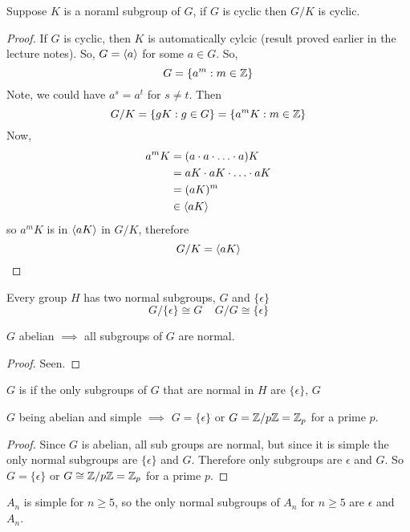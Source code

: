 \documentclass[openany]{report}
\begin{document}
\begin{prop}
    Suppose $K$ is a noraml subgroup of $G$, if $G$ is cyclic then $G / K$ is cyclic. 
\end{prop}

\begin{proof}
    If $G$ is cyclic, then $K$ is automatically cylcic (result proved earlier in the lecture notes). So, $G = \langle a \rangle$ for some $a \in G$. So,
    \[G = \{a^m : m \in \mathbb{Z}\}\]
    Note, we could have $a^s = a^t$ for $s \neq t$. Then 
    \[G/K = \{gK: g \in G\} = \{a^mK: m \in \mathbb{Z}\}\]
    Now, 
    \begin{align*}
        a^mK &= (a\cdot a\cdot \ldots \cdot a )K\\
            &= aK \cdot aK \cdot \ldots \cdot aK\\
            &= (aK)^m\\
            &\in \langle aK \rangle
        \end{align*}
        so $a^mK$ is in $\langle aK \rangle$ in $G / K$, therefore 
        \[G/K = \langle aK \rangle\]
\end{proof}
\begin{theorem}
    Every group $H$ has two normal subgroups, $G$ and $\{\epsilon\}$
    \[G/ \{\epsilon\} \cong G \ \ \ \ \ G / G \cong \{\epsilon\}\]
\end{theorem}
\begin{prop}
    $G$ abelian $\implies$ all subgroups of $G$ are normal.
\end{prop}
\begin{proof}
    Seen.
\end{proof}

\begin{definition}
    $G$ is  if the only subgroups of $G$ that are normal in $H$ are $\{\epsilon\}$, $G$
\end{definition}
\begin{theorem}
    $G$ being abelian and simple $\implies$ $G = \{\epsilon\}$ or $G = \mathbb{Z}/p\mathbb{Z} = \mathbb{Z}_p$ for a prime $p$.
\end{theorem}

\begin{proof}
    Since $G$ is abelian, all sub groups are normal, but since it is simple the only normal subgroups are $\{\epsilon\}$ and $G$. Therefore only subgroups are $\epsilon$ and $G$. So $G = \{\epsilon\}$ or $G \cong \mathbb{Z}/p\mathbb{Z} = \mathbb{Z}_p$ for a prime $p$.  
\end{proof}

\begin{theorem}
    $A_n$ is simple for $n \geq 5$, so the only normal subgroups of $A_n$ for $n \geq 5$ are $\epsilon$ and $A_n$. 
\end{theorem}
\end{document}
